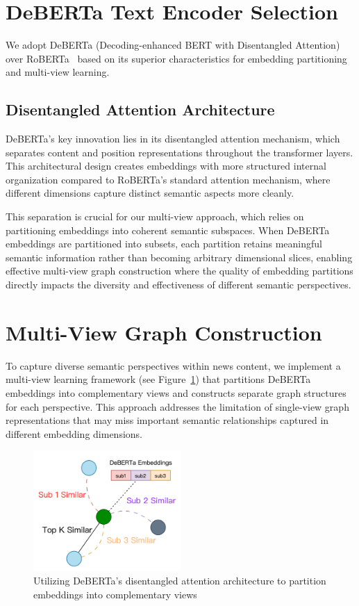 \section{DeBERTa Text Encoder Selection}

We adopt DeBERTa (Decoding-enhanced BERT with Disentangled Attention)~\cite{he2021deberta} over RoBERTa~\cite{liu2019roberta} based on its superior characteristics for embedding partitioning and multi-view learning.

\subsection{Disentangled Attention Architecture}

DeBERTa's key innovation lies in its disentangled attention mechanism, which separates content and position representations throughout the transformer layers. This architectural design creates embeddings with more structured internal organization compared to RoBERTa's standard attention mechanism, where different dimensions capture distinct semantic aspects more cleanly.

This separation is crucial for our multi-view approach, which relies on partitioning embeddings into coherent semantic subspaces. When DeBERTa embeddings are partitioned into subsets, each partition retains meaningful semantic information rather than becoming arbitrary dimensional slices, enabling effective multi-view graph construction where the quality of embedding partitions directly impacts the diversity and effectiveness of different semantic perspectives.

\section{Multi-View Graph Construction}

To capture diverse semantic perspectives within news content, we implement a multi-view learning framework (see Figure~\ref{fig:multi_view}) that partitions DeBERTa embeddings into complementary views and constructs separate graph structures for each perspective. This approach addresses the limitation of single-view graph representations that may miss important semantic relationships captured in different embedding dimensions.

\begin{figure}[h]
    \centering
    \includegraphics[width=0.5\textwidth]{context/methodology/fig/multi_view.png}
    \caption{Utilizing DeBERTa's disentangled attention architecture to partition embeddings into complementary views}
    \label{fig:multi_view}
\end{figure}

